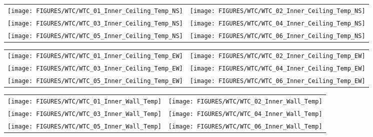 \begin{figure}[p]
\begin{tabular*}{\textwidth}{l@{\extracolsep{\fill}}r}
\texttt{[image: FIGURES/WTC/WTC\_01\_Inner\_Ceiling\_Temp\_NS]} &
\texttt{[image: FIGURES/WTC/WTC\_02\_Inner\_Ceiling\_Temp\_NS]} \\
\texttt{[image: FIGURES/WTC/WTC\_03\_Inner\_Ceiling\_Temp\_NS]} &
\texttt{[image: FIGURES/WTC/WTC\_04\_Inner\_Ceiling\_Temp\_NS]} \\
\texttt{[image: FIGURES/WTC/WTC\_05\_Inner\_Ceiling\_Temp\_NS]} &
\texttt{[image: FIGURES/WTC/WTC\_06\_Inner\_Ceiling\_Temp\_NS]}
\end{tabular*}
\label{NIST_WTC_Inner_Ceiling_NS}
\end{figure}

\begin{figure}[p]
\begin{tabular*}{\textwidth}{l@{\extracolsep{\fill}}r}
\texttt{[image: FIGURES/WTC/WTC\_01\_Inner\_Ceiling\_Temp\_EW]} &
\texttt{[image: FIGURES/WTC/WTC\_02\_Inner\_Ceiling\_Temp\_EW]} \\
\texttt{[image: FIGURES/WTC/WTC\_03\_Inner\_Ceiling\_Temp\_EW]} &
\texttt{[image: FIGURES/WTC/WTC\_04\_Inner\_Ceiling\_Temp\_EW]} \\
\texttt{[image: FIGURES/WTC/WTC\_05\_Inner\_Ceiling\_Temp\_EW]} &
\texttt{[image: FIGURES/WTC/WTC\_06\_Inner\_Ceiling\_Temp\_EW]}
\end{tabular*}
\label{NIST_WTC_Inner_Ceiling_EW}
\end{figure}

\begin{figure}[p]
\begin{tabular*}{\textwidth}{l@{\extracolsep{\fill}}r}
\texttt{[image: FIGURES/WTC/WTC\_01\_Inner\_Wall\_Temp]} &
\texttt{[image: FIGURES/WTC/WTC\_02\_Inner\_Wall\_Temp]} \\
\texttt{[image: FIGURES/WTC/WTC\_03\_Inner\_Wall\_Temp]} &
\texttt{[image: FIGURES/WTC/WTC\_04\_Inner\_Wall\_Temp]} \\
\texttt{[image: FIGURES/WTC/WTC\_05\_Inner\_Wall\_Temp]} &
\texttt{[image: FIGURES/WTC/WTC\_06\_Inner\_Wall\_Temp]}
\end{tabular*}
\label{NIST_WTC_Inner_Wall}
\end{figure}

\clearpage



